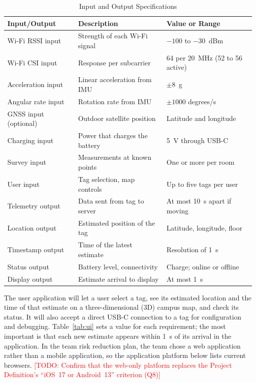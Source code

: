 \documentclass[12pt,letterpaper]{article}
\newenvironment{spectable}{\setstretch{1.0}\renewcommand{\arraystretch}{1.1}}{}
\newcommand{\TODO}[1]{\textcolor{red}{[TODO: #1]}}
\begin{document}
\begin{table}[!htb]
\caption{Input and Output Specifications}
\label{tab:io}
\centering
\begin{spectable}
\begin{tabularx}{\linewidth}{@{}L{1.75in} Y L{2.0in}@{}}
\toprule
\textbf{Input/Output} & \textbf{Description} & \textbf{Value or Range} \\
\midrule
Wi-Fi RSSI input & Strength of each Wi-Fi signal & $-100$ to $-30$~dBm \\
Wi-Fi CSI input & Response per subcarrier \cite{espcsi} & 64 per 20~MHz (52 to 56 active) \\
Acceleration input & Linear acceleration from IMU & $\pm 8$~g \\
Angular rate input & Rotation rate from IMU & $\pm 1000$ degrees/s \\
GNSS input (optional) & Outdoor satellite position & Latitude and longitude \\
Charging input & Power that charges the battery & 5~V through USB-C \\
Survey input & Measurements at known points & One or more per room \\
User input & Tag selection, map controls & Up to five tags per user \\
\midrule
Telemetry output & Data sent from tag to server & At most 10~s apart if moving \\
Location output & Estimated position of the tag & Latitude, longitude, floor \\
Timestamp output & Time of the latest estimate & Resolution of 1~s \\
Status output & Battery level, connectivity & Charge; online or offline \\
Display output & Estimate arrival to display & At most 1~s \\
\bottomrule
\end{tabularx}
\end{spectable}
\end{table}

The user application will let a user select a tag, see its estimated location and the time of that
estimate on a three-dimensional (3D) campus map, and check its status. It will also accept a direct
USB-C connection to a tag for configuration and debugging.
Table~\ref{tab:ui} sets a value for each requirement; the most important is that each new estimate
appears within 1~s of its arrival in the application. In the team risk reduction plan, the team chose
a web application rather than a mobile application, so the application platform below lists current
browsers. \TODO{Confirm that the web-only platform replaces the Project Definition's ``iOS~17 or
Android~13'' criterion (Q8)}
\end{document}
